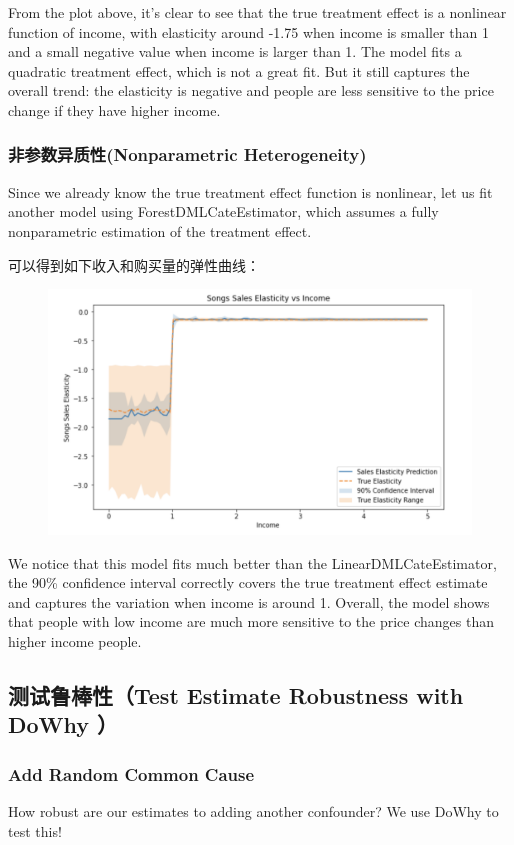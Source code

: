\documentclass[12pt]{article}
\begin{document}
From the plot above, it's clear to see that the true treatment effect is a nonlinear function of income, with elasticity around -1.75 when income is smaller than 1 and a small negative value when income is larger than 1. The model fits a quadratic treatment effect, which is not a great fit. But it still captures the overall trend: the elasticity is negative and people are less sensitive to the price change if they have higher income.

\subsubsection{非参数异质性(Nonparametric Heterogeneity)}
Since we already know the true treatment effect function is nonlinear, let us fit another model using ForestDMLCateEstimator, which assumes a fully nonparametric estimation of the treatment effect.

可以得到如下收入和购买量的弹性曲线：
\begin{figure}[H]
    \centering
    \includegraphics[width=.6\textwidth]{fig/Casual_Inference_Microsoft_Example_5.png}
\end{figure}

We notice that this model fits much better than the LinearDMLCateEstimator, the 90\% confidence interval correctly covers the true treatment effect estimate and captures the variation when income is around 1. Overall, the model shows that people with low income are much more sensitive to the price changes than higher income people.

\subsection{测试鲁棒性（Test Estimate Robustness with DoWhy ）}
\subsubsection{Add Random Common Cause}
How robust are our estimates to adding another confounder? We use DoWhy to test this!
\end{document}
